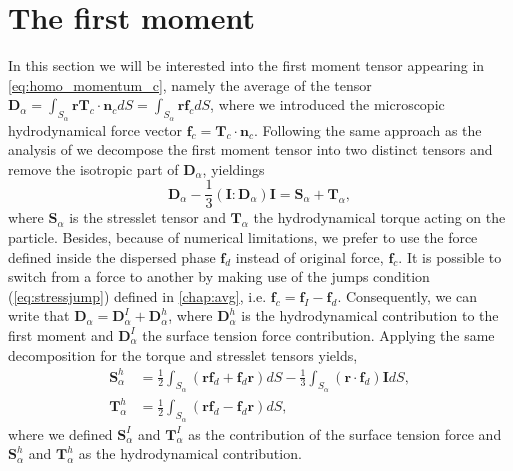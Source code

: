 \section{The first moment}
In this section we will be interested into the first moment tensor appearing in \ref{eq:homo_momentum_c}, namely the average of the tensor $\textbf{D}_\alpha = \int_{S_\alpha} \textbf{r}\textbf{T}_c\cdot \textbf{n}_c dS = \int_{S_\alpha} \textbf{rf}_c dS$, where we introduced the microscopic hydrodynamical force vector $\textbf{f}_c = \textbf{T}_c\cdot \textbf{n}_c$.
Following the same approach as the analysis of \citet[chapter 2]{kim2013microhydrodynamics} we decompose the first moment tensor into two distinct tensors and remove the isotropic part of $\textbf{D}_\alpha$, yieldings
\begin{equation*}
    \textbf{D}_\alpha - \frac{1}{3}(\textbf{I}:\textbf{D}_\alpha)\textbf{I}
    = \textbf{S}_\alpha+\textbf{T}_\alpha,
\end{equation*}
where $\textbf{S}_\alpha$ is the stresslet tensor and $\textbf{T}_\alpha$ the hydrodynamical torque acting on the particle. 
Besides, because of numerical limitations, we prefer to use the force defined inside the dispersed phase $\textbf{f}_d$ instead of original force, $\textbf{f}_c$. 
It is possible to switch from a force to another by making use of the jumps condition (\ref{eq:stressjump}) defined in \ref{chap:avg}, i.e. $\textbf{f}_c = \textbf{f}_I - \textbf{f}_d$. 
Consequently, we can write that $\textbf{D}_\alpha = \textbf{D}_\alpha^I + \textbf{D}_\alpha^h$, where $\textbf{D}_\alpha^h$ is the hydrodynamical contribution to the first moment and $\textbf{D}_\alpha^I$ the surface tension force contribution. 
Applying the same decomposition for the torque and stresslet tensors yields,
\begin{align*}
    \textbf{S}_\alpha^h &= 
    \frac{1}{2}\int_{S_\alpha}
    \left(
        \textbf{r} \textbf{f}_d + \textbf{f}_d \textbf{r}
    \right)dS
    - \frac{1}{3}\int_{S_\alpha}
        (\textbf{r} \cdot \textbf{f}_d )\textbf{I}
        dS,\\
        \textbf{T}_\alpha^h &= 
    \frac{1}{2}\int_{S_\alpha}
    \left(
        \textbf{r} \textbf{f}_d - \textbf{f}_d \textbf{r}
    \right)dS,
\end{align*}
where we defined $\textbf{S}_\alpha^I$ and $\textbf{T}_\alpha^I$ as the contribution of the surface tension force and $\textbf{S}_\alpha^h$ and $\textbf{T}_\alpha^h$ as the hydrodynamical contribution.


